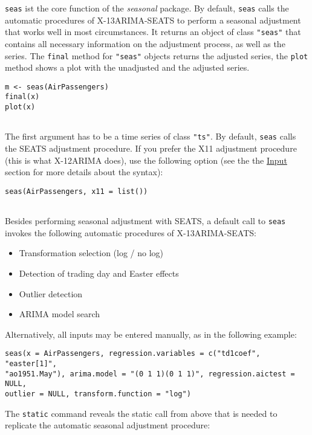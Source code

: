 \texttt{seas} ist the core function of the \emph{seasonal} package. By
default, \texttt{seas} calls the automatic procedures of X-13ARIMA-SEATS
to perform a seasonal adjustment that works well in most circumstances.
It returns an object of class \texttt{"seas"} that contains all
necessary information on the adjustment process, as well as the series.
The \texttt{final} method for \texttt{"seas"} objects returns the
adjusted series, the \texttt{plot} method shows a plot with the
unadjusted and the adjusted series.

\begin{verbatim}
m <- seas(AirPassengers)
final(x)
plot(x)
 
\end{verbatim}

The first argument has to be a time series of class \texttt{"ts"}. By
default, \texttt{seas} calls the SEATS adjustment procedure. If you
prefer the X11 adjustment procedure (this is what X-12ARIMA does), use
the following option (see the the \hyperref[input]{Input} section for
more details about the syntax):

\begin{verbatim}
seas(AirPassengers, x11 = list())
 
\end{verbatim}

Besides performing seasonal adjustment with SEATS, a default call to
\texttt{seas} invokes the following automatic procedures of
X-13ARIMA-SEATS:

\begin{itemize}
\itemsep1pt\parskip0pt
\item
  Transformation selection (log / no log)
\item
  Detection of trading day and Easter effects
\item
  Outlier detection
\item
  ARIMA model search
\end{itemize}

Alternatively, all inputs may be entered manually, as in the following
example:

\begin{verbatim}
seas(x = AirPassengers, regression.variables = c("td1coef", "easter[1]",
"ao1951.May"), arima.model = "(0 1 1)(0 1 1)", regression.aictest = NULL,
outlier = NULL, transform.function = "log")
\end{verbatim}

The \texttt{static} command reveals the static call from above that is
needed to replicate the automatic seasonal adjustment procedure:

